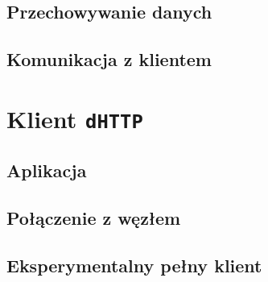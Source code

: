 \subsection{Przechowywanie danych}
\label{sec:dataPropagation}

\subsection{Komunikacja z klientem}




\section{Klient \texttt{dHTTP}}
\subsection{Aplikacja}
\subsection{Połączenie z węzłem}
\subsection{Eksperymentalny pełny klient}




